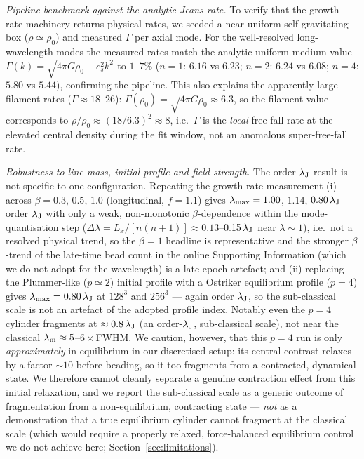 \documentclass[usenatbib,twoside,twocolumn]{mnras}
\begin{document}
\emph{Pipeline benchmark against the analytic Jeans rate.} To verify that the growth-rate machinery returns physical rates, we seeded a near-uniform self-gravitating box ($\rho\simeq\rho_0$) and measured $\Gamma$ per axial mode. For the well-resolved long-wavelength modes the measured rates match the analytic uniform-medium value $\Gamma(k)=\sqrt{4\pi G\rho_0-c_s^2k^2}$ to $1$--$7\%$ ($n{=}1$: $6.16$ vs $6.23$; $n{=}2$: $6.24$ vs $6.08$; $n{=}4$: $5.80$ vs $5.44$), confirming the pipeline. This also explains the apparently large filament rates ($\Gamma\approx18$--$26$): $\Gamma(\rho_0)=\sqrt{4\pi G\rho_0}\approx6.3$, so the filament value corresponds to $\rho/\rho_0\approx(18/6.3)^2\approx8$, i.e.\ $\Gamma$ is the \emph{local} free-fall rate at the elevated central density during the fit window, not an anomalous super-free-fall rate.

\emph{Robustness to line-mass, initial profile and field strength.} The order-$\lambda_{\rm J}$ result is not specific to one configuration. Repeating the growth-rate measurement (i) across $\beta=0.3$, $0.5$, $1.0$ (longitudinal, $f=1.1$) gives $\lambda_{\rm max}=1.00$, $1.14$, $0.80\,\lambda_{\rm J}$ --- order $\lambda_{\rm J}$ with only a weak, non-monotonic $\beta$-dependence within the mode-quantisation step ($\Delta\lambda=L_x/[n(n{+}1)]\approx0.13$--$0.15\,\lambda_{\rm J}$ near $\lambda\sim1$), i.e.\ not a resolved physical trend, so the $\beta=1$ headline is representative and the stronger $\beta$-trend of the late-time bead count in the online Supporting Information (which we do not adopt for the wavelength) is a late-epoch artefact; and (ii) replacing the Plummer-like ($p\simeq2$) initial profile with a Ostriker equilibrium profile ($p=4$) gives $\lambda_{\rm max}=0.80\,\lambda_{\rm J}$ at $128^3$ and $256^3$ --- again order $\lambda_{\rm J}$, so the sub-classical scale is not an artefact of the adopted profile index. Notably even the $p=4$ cylinder fragments at $\approx0.8\,\lambda_{\rm J}$ (an order-$\lambda_{\rm J}$, sub-classical scale), not near the classical $\lambda_{\rm m}\approx5$--$6\times$FWHM. We caution, however, that this $p=4$ run is only \emph{approximately} in equilibrium in our discretised setup: its central contrast relaxes by a factor $\sim10$ before beading, so it too fragments from a contracted, dynamical state. We therefore cannot cleanly separate a genuine contraction effect from this initial relaxation, and we report the sub-classical scale as a generic outcome of fragmentation from a non-equilibrium, contracting state --- \emph{not} as a demonstration that a true equilibrium cylinder cannot fragment at the classical scale (which would require a properly relaxed, force-balanced equilibrium control we do not achieve here; Section~\ref{sec:limitations}).
\end{document}
